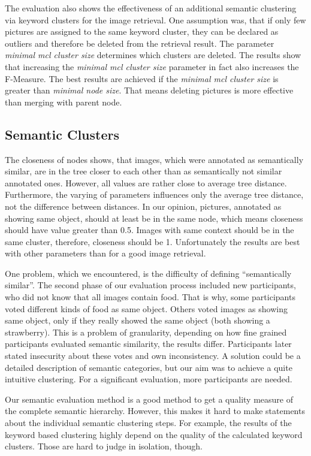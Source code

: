 \bigskip
The evaluation also shows the effectiveness of an additional semantic clustering via keyword clusters for the image retrieval. One assumption was, that if only few pictures are assigned to the same keyword cluster, they can be declared as outliers and therefore be deleted from the retrieval result. The parameter \emph{minimal mcl cluster size} determines which clusters are deleted. The results show that increasing the \emph{minimal mcl cluster size} parameter in fact also increases the F-Measure. The best results are achieved if the \emph{minimal mcl cluster size} is greater than \emph{minimal node size}. That means deleting pictures is more effective than merging with parent node.

\subsection{Semantic Clusters}	
The closeness of nodes shows, that images, which were annotated as semantically similar, are in the tree closer to each other than as semantically not similar annotated ones. However, all values are rather close to average tree distance. Furthermore, the varying of parameters influences only the average tree distance, not the difference between distances. In our opinion, pictures, annotated as showing same object, should at least be in the same node, which means closeness should have value greater than 0.5. Images with same context should be in the same cluster, therefore, closeness should be 1. Unfortunately the results are best with other parameters than for a good image retrieval.

\bigskip
One problem, which we encountered, is the difficulty of defining ``semantically similar''. The second phase of our evaluation process included new participants, who did not know that all images contain food. That is why, some participants voted different kinds of food as same object. Others voted images as showing same object, only if they really showed the same object (both showing a strawberry). This is a problem of granularity, depending on how fine grained participants evaluated semantic similarity, the results differ. Participants later stated insecurity about these votes and own inconsistency. A solution could be a detailed description of semantic categories, but our aim was to achieve a quite intuitive clustering. For a significant evaluation, more participants are needed. 

\bigskip
Our semantic evaluation method is a good method to get a quality measure of the complete semantic hierarchy. However, this makes it hard to make statements about the individual semantic clustering steps. For example, the results of the keyword based clustering highly depend on the quality of the calculated keyword clusters. Those are hard to judge in isolation, though.\\	

